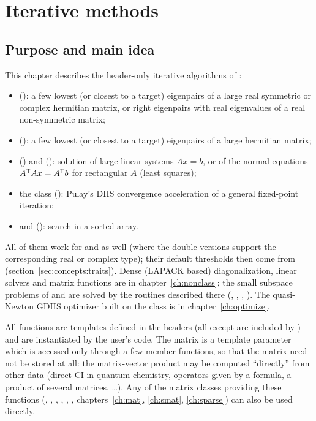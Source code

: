 \chapter{Iterative methods}\label{ch:iterative}


\section{Purpose and main idea}\label{sec:iterative:purpose}

This chapter describes the header-only iterative algorithms of \LA{}:
\begin{itemize}
\item {} (): a few lowest (or closest to a target) eigenpairs of a large real symmetric or
complex hermitian matrix, or right eigenpairs with real eigenvalues of a real non-symmetric matrix;
\item {} (): a few lowest (or closest to a target) eigenpairs of a large hermitian matrix;
\item {} () and  (): solution of large linear systems $Ax=b$,
or of the normal equations $A^{\mathsf T} Ax=A^{\mathsf T} b$ for rectangular $A$ (least squares);
\item the class  (): Pulay's DIIS convergence acceleration of a general fixed-point iteration;
\item {} and  (): search in a sorted array.
\end{itemize}
All of them work for  and  as well (where the double versions support the
corresponding real or complex type); their default thresholds then come from 
(section~\ref{sec:concepts:traits}).
Dense (LAPACK based) diagonalization, linear solvers and matrix functions are in chapter~\ref{ch:nonclass}; the small
subspace problems of  and  are solved by the routines described there
(, , , ). The quasi-Newton GDIIS optimizer built on
the  class is in chapter~\ref{ch:optimize}.

All functions are templates defined in the headers (all except  are included by ) and are
instantiated by the user's code. The matrix is a template parameter  which is accessed only through a few member
functions, so that the matrix need not be stored at all: the matrix-vector product may be computed ``directly'' from other
data (direct CI in quantum chemistry, operators given by a formula, a product of several matrices, \dots). Any of the \LA{}
matrix classes providing these functions (, , , , ,
, chapters~\ref{ch:mat}, \ref{ch:smat}, \ref{ch:sparse}) can also be used directly.

